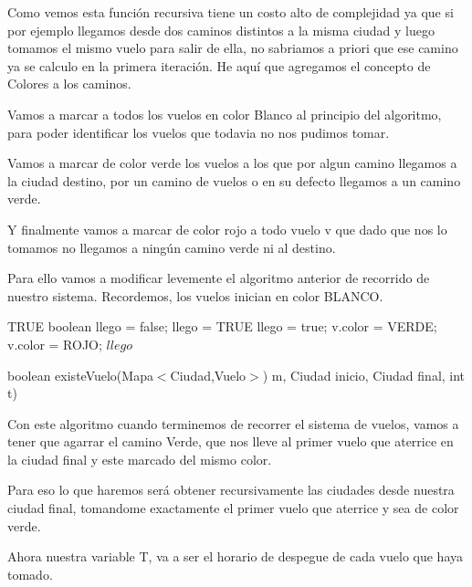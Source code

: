 Como vemos esta funci\'on recursiva tiene un costo alto de complejidad ya que si por ejemplo llegamos desde dos caminos distintos a la misma ciudad y luego tomamos el mismo vuelo para salir de ella, no sabriamos a priori que ese camino ya se calculo en la primera iteraci\'on. He aqu\'i que agregamos el concepto de Colores a los caminos.

Vamos a marcar a todos los vuelos en color Blanco al principio del algoritmo, para poder identificar los vuelos que todavia no nos pudimos tomar.

Vamos a marcar de color verde los vuelos a los que por algun camino llegamos a la ciudad destino, por un camino de vuelos o en su defecto llegamos a un camino verde.

Y finalmente vamos a marcar de color rojo a todo vuelo v que dado que nos lo tomamos no llegamos a ning\'un camino verde ni al destino.

Para ello vamos a modificar levemente el algoritmo anterior de recorrido de nuestro sistema. Recordemos, los vuelos inician en color BLANCO.

\begin{algorithm}[H]
\begin{algorithmic}[1]
		\RETURN TRUE
\ENDIF
\STATE boolean llego = false;
			\STATE llego = TRUE
        \ENDIF
				\STATE llego = true;
				\STATE v.color = VERDE;
			\ELSE
				\STATE v.color = ROJO;								
	    		\ENDIF    			
		\ENDIF		    
    \ENDIF
\ENDFOR
\RETURN $llego$
\caption{boolean existeVuelo(Mapa$<$Ciudad,Vuelo$>$) m, Ciudad inicio, Ciudad final, int t)}%
\end{algorithmic}
\end{algorithm}

Con este algoritmo cuando terminemos de recorrer el sistema de vuelos, vamos a tener que agarrar el camino Verde, que nos lleve al primer vuelo que aterrice en la ciudad final y este marcado del mismo color.

Para eso lo que haremos ser\'a obtener recursivamente las ciudades desde nuestra ciudad final, tomandome exactamente el primer vuelo que aterrice y sea de color verde.

Ahora nuestra variable T, va a ser el horario de despegue de cada vuelo que haya tomado. 

